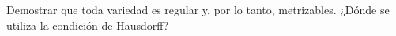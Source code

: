 
\item Demostrar que toda variedad es regular y, por lo tanto, metrizables. ¿Dónde se utiliza la condición de Hausdorff?
